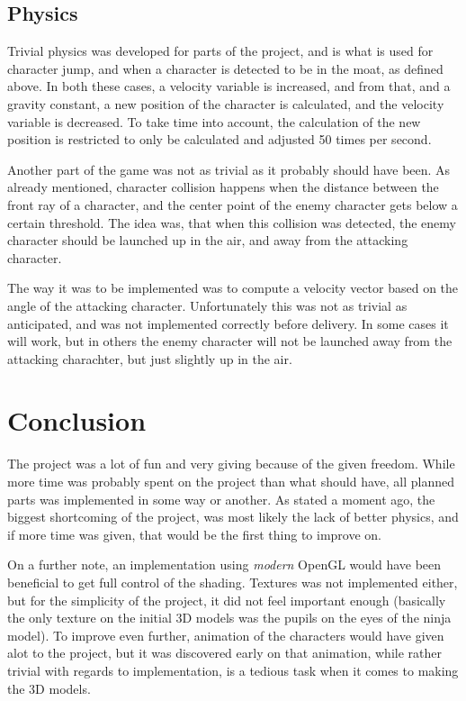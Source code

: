 \documentclass[12pt,a4paper,titlepage]{article}
\begin{document}
\subsection*{Physics}
\label{sec-2-5}
Trivial physics was developed for parts of the project, and is what is used
for character jump, and when a character is detected to be in the moat, as
defined above. In both these cases, a velocity variable is increased, and
from that, and a gravity constant, a new position of the character is
calculated, and the velocity variable is decreased. To take time into account,
the calculation of the new position is restricted to only be calculated and
adjusted 50 times per second.

Another part of the game was not as
trivial as it probably should have been. As already mentioned, character
collision happens when the distance between the front ray of a character, and
the center point of the enemy character gets below a certain threshold. The
idea was, that when this collision was detected, the enemy character should be
launched up in the air, and away from the attacking character. 

The way it was to be implemented was to compute a velocity vector based on
the angle of the attacking character. Unfortunately this was not as trivial
as anticipated, and was not implemented correctly before delivery. In some
cases it will work, but in others the enemy character will not be launched
away from the attacking charachter, but just slightly up in the air.


\section{Conclusion}
\label{sec-3}
The project was a lot of fun and very giving because of the given freedom.
While more time was probably spent on the project than what should have, all
planned parts was implemented in some way or another. As stated a moment ago,
the biggest shortcoming of the project, was most likely the lack of better
physics, and if more time was given, that would be the first thing to improve
on.

On a further note, an implementation using \emph{modern} OpenGL would have been
beneficial to get full control of the shading. Textures was not implemented
either, but for the simplicity of the project, it did not feel important
enough (basically the only texture on the initial 3D models was the pupils on
the eyes of the ninja model). To improve even further, animation of the
characters would have given alot to the project, but it was discovered early
on that animation, while rather trivial with regards to implementation, is a tedious
task when it comes to making the 3D models.
\end{document}
